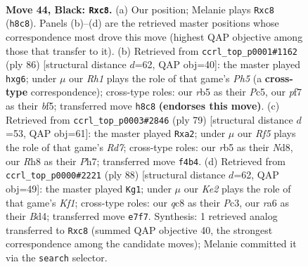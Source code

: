 \documentclass[11pt]{article}
\begin{document}
\clearpage

\begin{figure}[p]\centering
\begin{subfigure}{0.46\textwidth}\centering
\resizebox{\linewidth}{!}{%
\newchessgame
\chessboard[
  setfen={2Q4r/4kP2/R6b/1R6/1P3r1p/5B2/5K2/8 b - - 0 44},
  showmover=false,
  pgfstyle=straightmove, color=movearrow, markmove={h8-c8}
]}
\caption{}
\end{subfigure}\hfill
\begin{subfigure}{0.46\textwidth}\centering
\resizebox{\linewidth}{!}{%
\newchessgame
\chessboard[
  setfen={6k1/8/3R1pp1/2P2b1P/pr1B1K2/8/8/8 w - - 0 44},
  showmover=false,
  pgfstyle=straightmove, color=movearrow, markmove={h5-g6}
]}
\caption{}
\end{subfigure}
\\[4pt]
\begin{subfigure}{0.46\textwidth}\centering
\resizebox{\linewidth}{!}{%
\newchessgame
\chessboard[
  setfen={3n1k2/7p/4b1pP/2r1R3/3b4/Q7/P2rB1K1/8 b - - 8 40},
  showmover=false,
  pgfstyle=straightmove, color=movearrow, markmove={d2-a2}
]}
\caption{}
\end{subfigure}\hfill
\begin{subfigure}{0.46\textwidth}\centering
\resizebox{\linewidth}{!}{%
\newchessgame
\chessboard[
  setfen={1Rb4r/5k2/1Rp2p2/8/P2B4/2P3P1/2r5/5K2 w - - 1 45},
  showmover=false,
  pgfstyle=straightmove, color=movearrow, markmove={f1-g1}
]}
\caption{}
\end{subfigure}
\caption{\textbf{Move 44, Black: \texttt{Rxc8}.} (a) Our position; Melanie plays \texttt{Rxc8} (\texttt{h8c8}). Panels (b)--(d) are the retrieved master positions whose correspondence most drove this move (highest QAP objective among those that transfer to it). (b) Retrieved from \texttt{ccrl\_top\_p0001\#1162} (ply 86) [structural distance $d$=62, QAP obj=40]: the master played \texttt{hxg6}; under $\mu$ our \emph{Rh1} plays the role of that game's \emph{Ph5} (a \textbf{cross-type} correspondence); cross-type roles: our \emph{r}b5 as their \emph{P}c5, our \emph{p}f7 as their \emph{b}f5; transferred move \texttt{h8c8} \textbf{(endorses this move)}. (c) Retrieved from \texttt{ccrl\_top\_p0003\#2846} (ply 79) [structural distance $d$=53, QAP obj=61]: the master played \texttt{Rxa2}; under $\mu$ our \emph{Rf5} plays the role of that game's \emph{Rd7}; cross-type roles: our \emph{r}b5 as their \emph{N}d8, our \emph{R}h8 as their \emph{P}h7; transferred move \texttt{f4b4}. (d) Retrieved from \texttt{ccrl\_top\_p0000\#2221} (ply 88) [structural distance $d$=62, QAP obj=49]: the master played \texttt{Kg1}; under $\mu$ our \emph{Ke2} plays the role of that game's \emph{Kf1}; cross-type roles: our \emph{q}c8 as their \emph{P}c3, our \emph{r}a6 as their \emph{B}d4; transferred move \texttt{e7f7}. Synthesis: 1 retrieved analog transferred to \texttt{Rxc8} (summed QAP objective 40, the strongest correspondence among the candidate moves); Melanie committed it via the \texttt{search} selector.}
\label{fig:thought-m87}
\end{figure}
\end{document}
